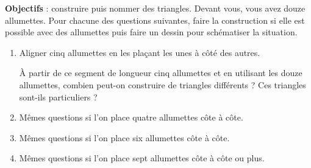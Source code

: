 \begin{activite}
    {\bf Objectifs} : construire puis nommer des triangles. 
       Devant vous, vous avez douze allumettes. Pour chacune des questions suivantes, faire la construction si elle est possible avec des allumettes puis faire un dessin pour schématiser la situation. \\
       \vspace*{-7mm}
       \begin{enumerate}
          \item Aligner cinq allumettes en les plaçant les unes à côté des autres.
          \smallskip
          \begin{center}
          \end{center}
          \smallskip
          À partir de ce segment de longueur cinq allumettes et en utilisant les douze allumettes, combien peut-on construire de triangles différents ? Ces triangles sont-ils particuliers ? \\ [4cm]
          \item Mêmes questions si l'on place quatre allumettes côte à côte. \\ [3cm]
          \item Mêmes questions si l'on place six allumettes côte à côte. \\ [3cm]
          \item Mêmes questions si l'on place sept allumettes côte à côte ou plus. \\ [3cm]
       \end{enumerate}
 \end{activite}